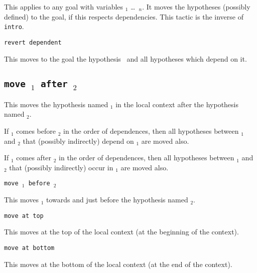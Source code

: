 \begin{coq_example*}
This applies to any goal with variables \ident$_1$ \dots\ \ident$_n$.
It moves the hypotheses (possibly defined) to the goal, if this respects
dependencies. This tactic is the inverse of {\tt intro}.

\begin{ErrMsgs}
\item {}
\end{ErrMsgs}

\begin{Variants}
\item {\tt revert dependent \ident {}}

 This moves to the goal the hypothesis \ident\ and all hypotheses
 which depend on it.

\end{Variants}

\subsection{\tt move {\ident$_1$} after {\ident$_2$}}
\label{move}

This moves the hypothesis named {\ident$_1$} in the local context
after the hypothesis named {\ident$_2$}.

If {\ident$_1$} comes before {\ident$_2$} in the order of dependences,
then all hypotheses between {\ident$_1$} and {\ident$_2$} that
(possibly indirectly) depend on {\ident$_1$} are moved also.

If {\ident$_1$} comes after {\ident$_2$} in the order of dependences,
then all hypotheses between {\ident$_1$} and {\ident$_2$} that
(possibly indirectly) occur in {\ident$_1$} are moved also.

\begin{Variants}

\item {\tt move {\ident$_1$} before {\ident$_2$}}

This moves {\ident$_1$} towards and just before the hypothesis named {\ident$_2$}.

\item {\tt move {\ident} at top}

This moves {\ident} at the top of the local context (at the beginning of the context).

\item {\tt move {\ident} at bottom}

This moves {\ident} at the bottom of the local context (at the end of the context).


\end{Variants}
\end{coq_example*}
